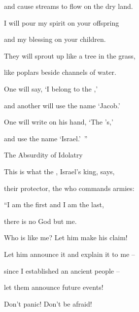 {\par }{\Q and cause streams
to flow on
the dry land.
\par }{\Q I will pour
my spirit
on
your offspring
\par }{\Q and my blessing
on
your children.
\par }{\Q {}They will sprout
up like a tree in the grass,
\par }{\Q like poplars
beside
channels
of water.
\par }{\Q {}One
will say,
‘I belong
to the
{},’
\par }{\Q and another
will use the name
‘Jacob.’
\par }{\Q One
will write
on his hand,
‘The
{}’s,’
\par }{\Q and use
the name
‘Israel.’ ”
\par }{\SH The Absurdity of Idolatry
\par }{\Q {}This is what
the {}, Israel’s
king,
says,
\par }{\Q their protector,
the {}
who commands armies:
\par }{\Q “I am
the first
and I am
the last,
\par }{\Q there is no
God
but me.
\par }{\Q {}Who
is like
me? Let him make his claim!

\par }{\Q Let him announce
it and explain it to me –
\par }{\Q since I established an ancient people –

\par }{\Q let them announce future events!
\par }{\Q {}Don’t
panic! Don’t
be afraid!

}
